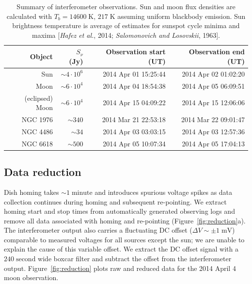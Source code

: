 \documentclass[10pt]{article}
\newcommand {\mt}{\mathrm}
\newcommand {\unit}[1]{\; \mt{#1}}
\begin{document}
\begin{table}[!ht]
\centering
\caption{Summary of interferometer observations.  Sun and moon flux densities are calculated with $T_b = 14600 \unit{K}$, $217 \unit{K}$ assuming uniform blackbody emission.  Sun brightness temperature is average of estimates for sunspot cycle minima and maxima [\textit{Hafez et al.}, 2014; \textit{Salomonovich and Losovskii}, 1963].}
\label{tab:obs}
\begin{tabular}{@{}rrrr@{}}
    \toprule
    Object & $S_\nu$ (Jy) & Observation start (UT) & Observation end (UT) \\
    \midrule
    Sun & $\sim 4 \cdot 10^6$ & 2014 Apr 01 15:25:44 & 2014 Apr 02 01:02:20 \\
    Moon & $\sim 6 \cdot 10^4$ & 2014 Apr 04 18:54:38 & 2014 Apr 05 06:09:51 \\
    (eclipsed) Moon & $\sim 6 \cdot 10^4$ & 2014 Apr 15 04:09:22 & 2014 Apr 15 12:06:06 \\
    NGC 1976 & $\sim 340$ & 2014 Mar 21 22:53:18 & 2014 Mar 22 09:01:47 \\
    NGC 4486 & $\sim 34$ & 2014 Apr 03 03:03:15 & 2014 Apr 03 12:57:36 \\  %
    NGC 6618 & $\sim 500$ & 2014 Apr 05 10:07:34 & 2014 Apr 05 17:04:13 \\
    \bottomrule
\end{tabular}
\end{table}

\subsection{Data reduction}

Dish homing takes $\sim1 \unit{minute}$ and introduces spurious voltage spikes as data collection continues during homing and subsequent re-pointing.  We extract homing start and stop times from automatically generated observing logs and remove all data associated with homing and re-pointing (Figure~\ref{fig:reduction}a).  The interferometer output also carries a fluctuating DC offset ($\Delta V \sim \pm 1 \unit{mV}$) comparable to measured voltages for all sources except the sun; we are unable to explain the cause of this variable offset.  We extract the DC offset signal with a $240 \unit{second}$ wide boxcar filter and subtract the offset from the interferometer output.  Figure~\ref{fig:reduction} plots raw and reduced data for the 2014 April 4 moon observation.
\end{document}

